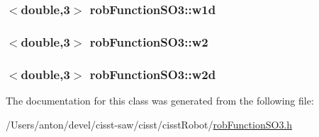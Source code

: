 \subsubsection[{w1d}]{$<$double,3$>$ rob\+Function\+S\+O3\+::w1d\hspace{0.3cm}{\ttfamily [protected]}}\label{classrob_function_s_o3_ae01c6c68ea9ed10bf462d7103cf3ed7d}
\hypertarget{classrob_function_s_o3_af26136555c376caff1bb1e84f1b3b3f1}{}
\subsubsection[{w2}]{$<$double,3$>$ rob\+Function\+S\+O3\+::w2\hspace{0.3cm}{\ttfamily [protected]}}\label{classrob_function_s_o3_af26136555c376caff1bb1e84f1b3b3f1}
\hypertarget{classrob_function_s_o3_a888acaf14bf3ff075b5a13e811e52ab0}{}
\subsubsection[{w2d}]{$<$double,3$>$ rob\+Function\+S\+O3\+::w2d\hspace{0.3cm}{\ttfamily [protected]}}\label{classrob_function_s_o3_a888acaf14bf3ff075b5a13e811e52ab0}


The documentation for this class was generated from the following file\+:\begin{DoxyCompactItemize}
\item 
/\+Users/anton/devel/cisst-\/saw/cisst/cisst\+Robot/\hyperlink{rob_function_s_o3_8h}{rob\+Function\+S\+O3.\+h}\end{DoxyCompactItemize}
